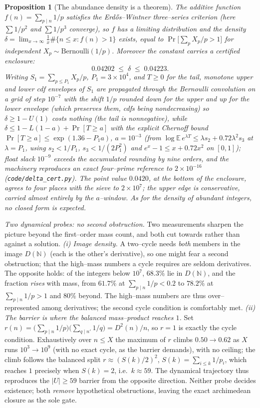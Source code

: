 \documentclass[11pt]{article}
\newtheorem{proposition}[theorem]{Proposition}
\theoremstyle{definition}
\begin{document}
\begin{proposition}[The abundance density is a theorem]\label{prop:density}
The additive function $f(n)=\sum_{p\mid n}1/p$ satisfies the Erd\H{o}s--Wintner three--series
criterion \cite{Tenenbaum} (here $\sum 1/p^2$ and $\sum 1/p^3$ converge), so $f$ has a limiting
distribution and the
density $\delta=\lim_{x\to\infty}\tfrac1x\#\{n\le x:f(n)>1\}$ exists, equal to $\Pr\bigl[\sum_p
X_p/p>1\bigr]$ for independent $X_p\sim\mathrm{Bernoulli}(1/p)$. Moreover the constant carries a
\emph{certified} enclosure:
\[ 0.04202\;\le\;\delta\;\le\;0.04223. \]
Writing $S_1=\sum_{p\le P_1}X_p/p$, $P_1=3\times10^4$, and $T\ge0$ for the tail, monotone upper and
lower cdf envelopes of $S_1$ are propagated through the Bernoulli convolution on a grid of step
$10^{-7}$ with the shift $1/p$ rounded down for the upper and up for the lower envelope (which
preserves them, cdfs being nondecreasing) so $\delta\ge1-U(1)$ costs nothing (the tail is
nonnegative), while $\delta\le1-L(1-a)+\Pr[T\ge a]$ with the explicit Chernoff bound
$\Pr[T\ge a]\le\exp(1.36-P_1a)$, $a=10^{-3}$ (from
$\log\mathbb{E}\,e^{\lambda T}\le\lambda s_2+0.72\lambda^2s_3$ at $\lambda=P_1$, using
$s_2<1/P_1$, $s_3<1/(2P_1^2)$ and $e^x-1\le x+0.72x^2$ on $[0,1]$); float slack $10^{-9}$ exceeds
the accumulated rounding by nine orders, and the machinery reproduces an exact four--prime
reference to $2\times10^{-16}$ (\texttt{code/delta\_cert.py}). The point value $0.0420$, at the
bottom of the enclosure, agrees to four places with the sieve to $2\times10^7$; the upper edge is
conservative, carried almost entirely by the $a$--window. As for the density of abundant integers,
no closed form is expected.
\end{proposition}

\emph{Two dynamical probes: no second obstruction.} Two measurements sharpen the picture beyond the first--order mass count, and both cut towards rather
than against a solution. \emph{(i) Image density.} A two--cycle needs \emph{both} members in the image
$D(\mathbb{N})$ (each is the other's derivative), so one might fear a second obstruction; that the
high--mass numbers a cycle requires are seldom derivatives. The opposite holds: of the integers below
$10^7$, $68.3\%$ lie in $D(\mathbb{N})$, and the fraction \emph{rises} with mass, from $61.7\%$ at
$\sum_{p\mid n}1/p<0.2$ to $78.2\%$ at $\sum_{p\mid n}1/p>1$ and $80\%$ beyond. The high--mass numbers
are thus over--represented among derivatives; the second cycle condition is comfortably met.
\emph{(ii) The barrier is where the balanced mass--product reaches $1$.} Set
$r(n)=\bigl(\sum_{p\mid n}1/p\bigr)\bigl(\sum_{q\mid n'}1/q\bigr)=D^2(n)/n$, so $r=1$ is exactly the
cycle condition. Exhaustively over $n\le X$ the maximum of $r$ climbs $0.50\to0.62$ as $X$ runs
$10^3\to10^9$ (with no exact cycle, as the barrier demands), with no ceiling; the climb follows the
balanced split $r\approx(S(k)/2)^2$, $S(k)=\sum_{i\le k}1/p_i$, which reaches $1$ precisely when
$S(k)=2$, i.e.\ $k\approx59$. The dynamical trajectory thus reproduces the $|U|\ge59$ barrier from the
opposite direction. Neither probe decides existence; both \emph{remove} hypothetical obstructions,
leaving the exact archimedean closure as the sole gate.
\end{document}
